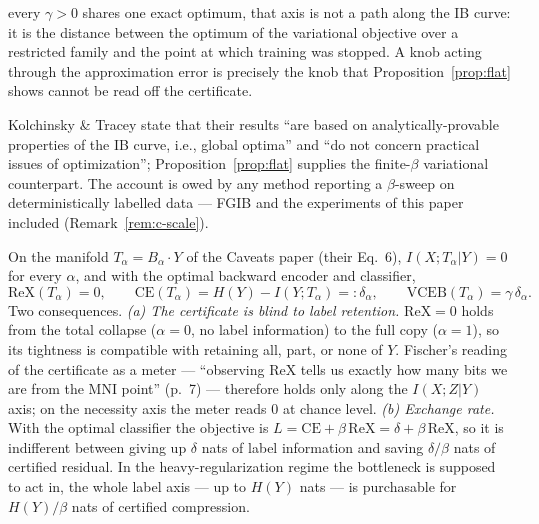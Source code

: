 \begin{remark}
\begin{enumerate}
every $\gamma > 0$ shares one exact optimum, that axis is not a path along the IB curve: it
is the distance between the optimum of the variational objective over a restricted family
and the point at which training was stopped. A knob acting through the approximation error
is precisely the knob that Proposition~\ref{prop:flat} shows cannot
be read off the certificate.
\end{enumerate}
Kolchinsky \& Tracey state that their results ``are based on analytically-provable
properties of the IB curve, i.e., global optima'' and ``do not concern practical issues of
optimization''; Proposition~\ref{prop:flat} supplies the finite-$\beta$ variational
counterpart. The account is owed by any method reporting a $\beta$-sweep on
deterministically labelled data --- FGIB and the experiments of this paper included
(Remark~\ref{rem:c-scale}).
\end{remark}



\begin{proposition}\label{prop:flat}
On the manifold $T_\alpha = B_\alpha \cdot Y$ of the Caveats paper (their Eq.~6),
$I(X;T_\alpha|Y) = 0$ for every $\alpha$, and with the optimal backward encoder and
classifier,
\begin{equation}
\mathrm{ReX}(T_\alpha) = 0,
\qquad
\mathrm{CE}(T_\alpha) = H(Y) - I(Y;T_\alpha) =: \delta_\alpha,
\qquad
\mathrm{VCEB}(T_\alpha) = \gamma\,\delta_\alpha .
\label{eq:vceb}
\end{equation}
Two consequences.
\emph{(a) The certificate is blind to label retention.} $\mathrm{ReX} = 0$ holds from the
total collapse ($\alpha = 0$, no label information) to the full copy ($\alpha = 1$), so its
tightness is compatible with retaining all, part, or none of $Y$. Fischer's reading of the
certificate as a meter --- ``observing ReX tells us exactly how many bits we are from the
MNI point'' (p.~7) --- therefore holds only along the $I(X;Z|Y)$ axis; on the necessity axis
the meter reads $0$ at chance level.
\emph{(b) Exchange rate.} With the optimal classifier the objective is
$L = \mathrm{CE} + \beta\,\mathrm{ReX} = \delta + \beta\,\mathrm{ReX}$, so it is indifferent
between giving up $\delta$ nats of label information and saving $\delta/\beta$ nats of
certified residual. In the heavy-regularization regime the bottleneck is supposed to act in,
the whole label axis --- up to $H(Y)$ nats --- is purchasable for $H(Y)/\beta$ nats of
certified compression.
\end{proposition}

